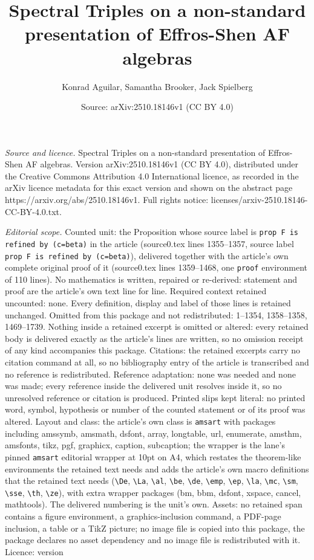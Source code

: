 \documentclass[10pt,a4paper]{amsart}
\title[Spectral Triples on a non-standard presentation of Effros-Sh]{Spectral Triples on a non-standard presentation of Effros-Shen AF algebras}
\author{Konrad Aguilar, Samantha Brooker, Jack Spielberg}
\date{Source: arXiv:2510.18146v1 (CC BY 4.0)}
\begin{document}
\maketitle

\noindent\emph{Source and licence.} Spectral Triples on a non-standard presentation of Effros-Shen AF algebras. Version arXiv:2510.18146v1 (CC BY 4.0), distributed under the Creative Commons Attribution 4.0 International licence, as recorded in the arXiv licence metadata for this exact version and shown on the abstract page https://arxiv.org/abs/2510.18146v1. Full rights notice: licenses/arxiv-2510.18146-CC-BY-4.0.txt.\par\smallskip

\noindent\textit{Editorial scope.} Counted unit: the Proposition whose source label is \texttt{prop F is refined by (c=beta)} in the article (source0.tex lines 1355--1357, source label \texttt{prop F is refined by (c=beta)}), delivered together with the article's own complete original proof of it (source0.tex lines 1359--1468, one \texttt{proof} environment of 110 lines). No mathematics is written, repaired or re-derived: statement and proof are the article's own text line for line. Required context retained uncounted: none. Every definition, display and label of those lines is retained unchanged. Omitted from this package and not redistributed: 1--1354, 1358--1358, 1469--1739. Nothing inside a retained excerpt is omitted or altered: every retained body is delivered exactly as the article's lines are written, so no omission receipt of any kind accompanies this package. Citations: the retained excerpts carry no citation command at all, so no bibliography entry of the article is transcribed and no reference is redistributed. Reference adaptation: none was needed and none was made; every reference inside the delivered unit resolves inside it, so no unresolved reference or citation is produced. Printed slips kept literal: no printed word, symbol, hypothesis or number of the counted statement or of its proof was altered. Layout and class: the article's own class is \texttt{amsart} with packages including amssymb, amsmath, dsfont, array, longtable, url, enumerate, amsthm, amsfonts, tikz, pgf, graphicx, caption, subcaption; the wrapper is the lane's pinned \texttt{amsart} editorial wrapper at 10pt on A4, which restates the theorem-like environments the retained text needs and adds the article's own macro definitions that the retained text needs (\texttt{\textbackslash De}, \texttt{\textbackslash La}, \texttt{\textbackslash al}, \texttt{\textbackslash be}, \texttt{\textbackslash de}, \texttt{\textbackslash emp}, \texttt{\textbackslash ep}, \texttt{\textbackslash la}, \texttt{\textbackslash mc}, \texttt{\textbackslash sm}, \texttt{\textbackslash sse}, \texttt{\textbackslash th}, \texttt{\textbackslash ze}), with extra wrapper packages (bm, bbm, dsfont, xspace, cancel, mathtools). The delivered numbering is the unit's own. Assets: no retained span contains a figure environment, a graphics-inclusion command, a PDF-page inclusion, a table or a TikZ picture; no image file is copied into this package, the package declares no asset dependency and no image file is redistributed with it. Licence: version 
\end{document}

